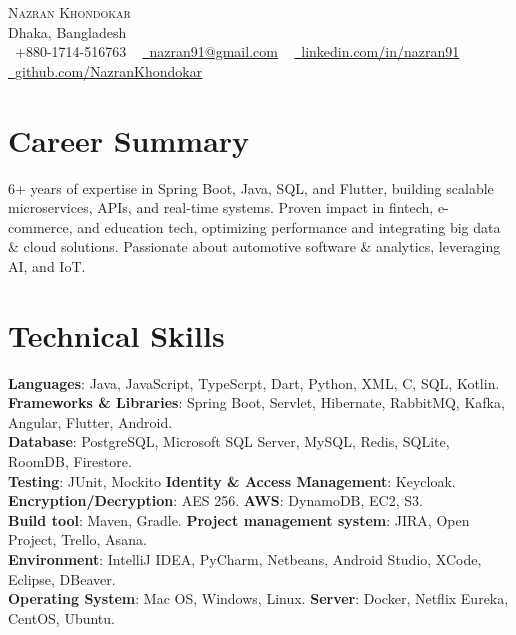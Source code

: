 \documentclass[letterpaper,11pt]{article}
\begin{document}

\begin{center}
    {\Huge \scshape Nazran Khondokar} \\ \vspace{1pt}
    Dhaka, Bangladesh \\ \vspace{1pt}
    \small \raisebox{-0.1\height}\faPhone\ +880-1714-516763 ~ \href{mailto:nazran91@gmail.com}{\raisebox{-0.2\height}\faEnvelope\  \underline{nazran91@gmail.com}} ~ 
    \href{https://www.linkedin.com/in/nazran91/}{\raisebox{-0.2\height}\faLinkedin\ \underline{linkedin.com/in/nazran91}}  ~
    \href{https://github.com/NazranKhondokar/}{\raisebox{-0.2\height}\faGithub\ \underline{github.com/NazranKhondokar}}
    \vspace{-8pt}
\end{center}

\section{Career Summary}
6+ years of expertise in Spring Boot, Java, SQL, and Flutter, building scalable microservices, APIs, and real-time systems. Proven impact in fintech, e-commerce, and education tech, optimizing performance and integrating big data & cloud solutions. Passionate about automotive software & analytics, leveraging AI, and IoT.
            

%
\section{Technical Skills}
 \begin{itemize}[leftmargin=0.15in, label={}]
    \small{\item{
     \textbf{Languages}{: Java, JavaScript, TypeScrpt, Dart, Python, XML, C, SQL, Kotlin.} \\
     \textbf{Frameworks \& Libraries}{: Spring Boot, Servlet, Hibernate, RabbitMQ, Kafka, Angular, Flutter, Android.}\\
     \textbf{Database}{: PostgreSQL, Microsoft SQL Server, MySQL, Redis, SQLite, RoomDB, Firestore.}\\
     \textbf{Testing}{: JUnit, Mockito}
     \textbf{Identity \& Access Management}{: Keycloak.}\\
     \textbf{Encryption/Decryption}{: AES 256.}
     \textbf{AWS}{: DynamoDB, EC2, S3.}\\
     \textbf{Build tool}{: Maven, Gradle.}
     \textbf{Project management system}{: JIRA, Open Project, Trello, Asana.}\\
     \textbf{Environment}{: IntelliJ IDEA, PyCharm, Netbeans, Android Studio, XCode, Eclipse, DBeaver.}\\
     \textbf{Operating System}{: Mac OS, Windows, Linux.}
     \textbf{Server}{: Docker, Netflix Eureka, CentOS, Ubuntu.}
    }}
 \end{itemize}
 \vspace{-16pt}
\end{document}

